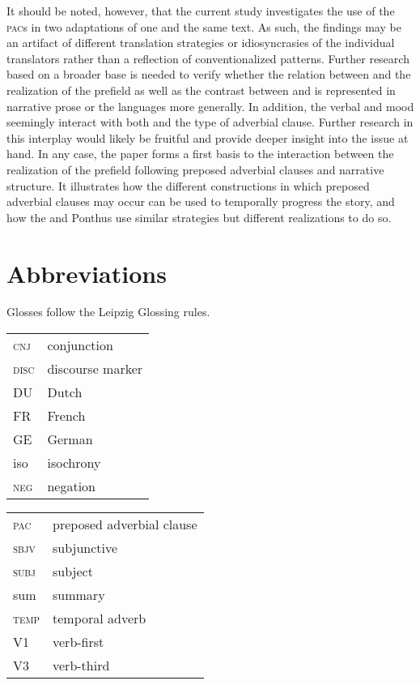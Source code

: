 \documentclass[output=paper,colorlinks,citecolor=brown]{langscibook}
\begin{document}
It should be noted, however, that the current study investigates the use of the \textsc{pac}s in two adaptations of one and the same text. As such, the findings may be an artifact of different translation strategies or idiosyncrasies of the individual translators rather than a reflection of conventionalized patterns. Further research based on a broader base is needed to verify whether the relation between  and the realization of the prefield as well as the contrast between  and  is represented in narrative prose or the languages more generally. In addition, the verbal  and mood seemingly interact with both  and the type of adverbial clause. Further research in this interplay would likely be fruitful and provide deeper insight into the issue at hand. In any case, the paper forms a first basis to the interaction between the realization of the prefield following preposed adverbial clauses and narrative structure. It illustrates how the different constructions in which preposed adverbial clauses may occur can be used to temporally progress the story, and how the  and  Ponthus use similar strategies but different realizations to do so.



\section*{Abbreviations}
Glosses follow the Leipzig Glossing rules.\\

\begin{tabularx}{.45\textwidth}{lQ}
\textsc{cnj} & conjunction \\
\textsc{disc} & discourse marker \\
DU & Dutch \\
FR & French \\
GE & German\\
iso & isochrony \\
\textsc{neg} & negation\\
\end{tabularx}
\begin{tabularx}{.5\textwidth}{lQ}
\textsc{pac} & preposed adverbial clause \\
\textsc{sbjv} & subjunctive\\
\textsc{subj} & subject\\
sum & summary\\
\textsc{temp} & temporal adverb\\
V1 & verb-first \\
V3 & verb-third \\
\end{tabularx}
\end{document}
